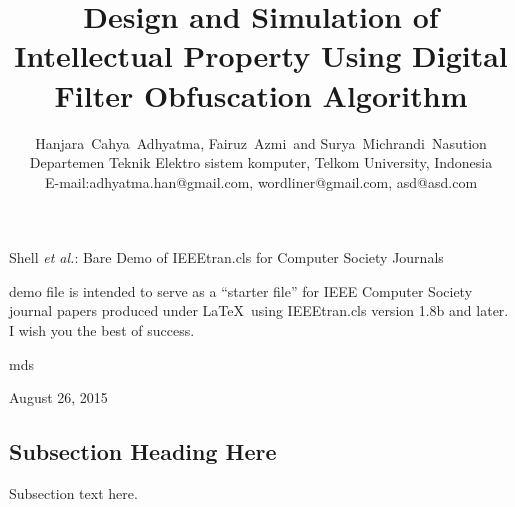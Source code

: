 \documentclass[10pt,journal,compsoc]{IEEEtran}
\begin{document}
\title{Design and Simulation of Intellectual Property Using Digital Filter Obfuscation Algorithm}

\author{
	Hanjara~Cahya~Adhyatma, Fairuz~Azmi~and Surya~Michrandi~Nasution \\
    Departemen Teknik Elektro sistem komputer, Telkom University, Indonesia\\
    E-mail:adhyatma.han@gmail.com, wordliner@gmail.com, asd@asd.com
}

{Shell \MakeLowercase{\textit{et al.}}: Bare Demo of IEEEtran.cls for Computer Society Journals}


\maketitle




 demo file is intended to serve as a ``starter file'' for IEEE Computer Society journal papers produced under \LaTeX\ using IEEEtran.cls version 1.8b and later. I wish you the best of success.

\hfill mds
 
\hfill August 26, 2015

\subsection{Subsection Heading Here}
Subsection text here.
\end{document}
